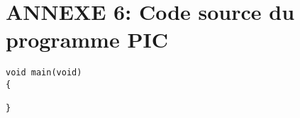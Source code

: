 \section{ANNEXE 6: Code source du programme PIC}
\begin{lstlisting}
void main(void)
{

}
\end{lstlisting}